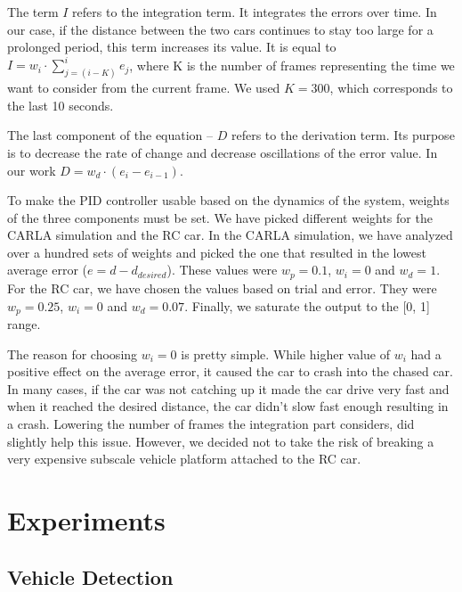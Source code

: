 The term $I$ refers to the integration term. It integrates the errors over time. In our case, if the distance between the two cars continues to stay too large for a prolonged period, this term increases its value. It is equal to $I = w_i\cdot \sum_{j=(i-K)}^{i} e_j$, where K is the number of frames representing the time we want to consider from the current frame. We used $K = 300$, which corresponds to the last 10 seconds.\par


The last component of the equation -- $D$ refers to the derivation term. Its purpose is to decrease the rate of change and decrease oscillations of the error value. In our work $D = w_d\cdot (e_i-e_{i-1})$. \par


To make the PID controller usable based on the dynamics of the system, weights of the three components must be set. We have picked different weights for the CARLA simulation and the RC car. In the CARLA simulation, we have analyzed over a hundred sets of weights and picked the one that resulted in the lowest average error ($e = d - d_{desired}$). These values were $w_p=0.1$, $w_i=0$ and $w_d=1$. For the RC car, we have chosen the values based on trial and error. They were $w_p=0.25$, $w_i=0$ and $w_d=0.07$. Finally, we saturate the output to the [0, 1] range. \par


The reason for choosing $w_i=0$ is pretty simple. While higher value of $w_i$ had a positive effect on the average error, it caused the car to crash into the chased car. In many cases, if the car was not catching up it made the car drive very fast and when it reached the desired distance, the car didn't slow fast enough resulting in a crash. Lowering the number of frames the integration part considers, did slightly help this issue. However, we decided not to take the risk of breaking a very expensive subscale vehicle platform attached to the RC car.



\chapter{Experiments}

\section{Vehicle Detection}
